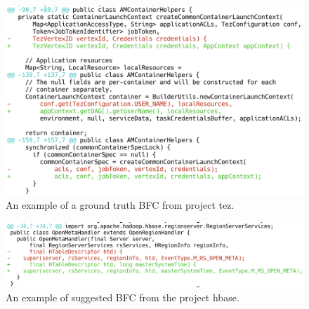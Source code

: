 \begin{figure}[!tbp]
\renewcommand{\arraystretch}{1}
    \centering
    \includegraphics[width=\linewidth]{figures/ps1.png}\hfill
    \caption{An example of a ground truth BFC from project tez.}
    \label{fig:ps_1}
\end{figure}

\begin{figure}[!tbp]
\renewcommand{\arraystretch}{1}
    \centering
    \includegraphics[width=\linewidth]{figures/ps2.png}\hfill
    \caption{An example of suggested BFC from the project hbase.}
    \label{fig:ps_2}
\end{figure}